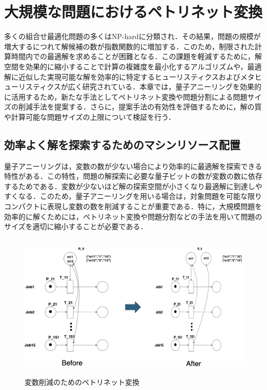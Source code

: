 \chapter{大規模な問題におけるペトリネット変換}
\label{main_survey}

多くの組合せ最適化問題の多くはNP-hardに分類され．その結果，問題の規模が増大するにつれて解候補の数が指数関数的に増加する．このため，制限された計算時間内での最適解を求めることが困難となる．この課題を軽減するために，解空間を効果的に縮小することで計算の複雑度を最小化するアルゴリズムや，最適解に近似した実現可能な解を効率的に特定するヒューリスティクスおよびメタヒューリスティクスが広く研究されている．本章では，量子アニーリングを効果的に活用するため，新たな手法としてペトリネット変換や問題分割による問題サイズの削減手法を提案する．さらに，提案手法の有効性を評価するために，解の質や計算可能な問題サイズの上限について検証を行う．

\section{効率よく解を探索するためのマシンリソース配置}
量子アニーリングは，変数の数が少ない場合により効率的に最適解を探索できる特性がある．この特性，問題の解探索に必要な量子ビットの数が変数の数に依存するためである．変数が少ないほど解の探索空間が小さくなり最適解に到達しやすくなる．このため，量子アニーリングを用いる場合は，対象問題を可能な限りコンパクトに表現し変数の数を削減することが重要である．特に，大規模問題を効率的に解くためには，ペトリネット変換や問題分割などの手法を用いて問題のサイズを適切に縮小することが必要である．

\begin{figure}[H]
    \centering
    \includegraphics[width=0.8\linewidth, height=7cm]{./images/transformation.png}
    \caption{変数削減のためのペトリネット変換}
    \label{fig:fig4}
\end{figure}

